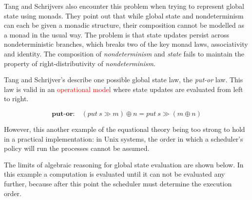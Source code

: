 \documentclass[logo,bsc,singlespacing,parskip]{infthesis}
\begin{document}
Tang and Schrijvers also encounter this problem when trying to represent global state using monads. They point out that while global state and nondeterminism can each be given a monadic structure, their composition cannot be modelled as a monad in the usual way. The problem is that state updates persist across nondeterministic branches, which breaks two of the key monad laws, associativity and identity. The composition of \textit{nondeterminism} and \textit{state} fails to maintain the property of right-distributivity of \textit{nondeterminism}.


Tang and Schrijver's describe one possible global state law,  the \textit{put-or} law. This law is valid in an \textcolor{red}{operational model} where state updates are evaluated from left to right.

\[
\textbf{put-or:} \quad (put\ s \gg m) \oplus n = put\ s \gg (m \oplus n) 
\]

However, this another example of the equational theory being too strong to hold in a practical implementation: in Unix systems, the order in which a scheduler's policy will run the processes cannot be assumed.


The limits of algebraic reasoning for global state evaluation are shown below. In this example a computation is evaluated until it can not be evaluated any further, because after this point the scheduler must determine the execution order.
\end{document}
